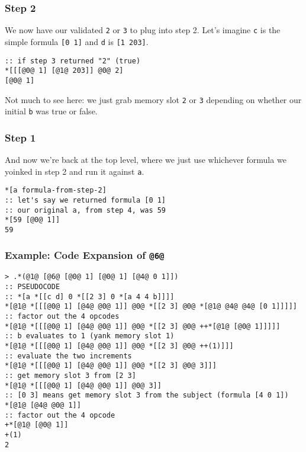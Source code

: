 \documentclass[twoside]{article}
\begin{document}
\subsubsection{Step 2}

We now have our validated \lstinline[style=inlinecode]{2} or \lstinline[style=inlinecode]{3} to plug into step 2. Let's imagine \lstinline[style=inlinecode]{c} is the simple formula \lstinline[style=inlinecode]{[0 1]} and \lstinline[style=inlinecode]{d} is \lstinline[style=inlinecode]{[1 203]}.

\begin{lstlisting}[style=listingblock]
:: if step 3 returned "2" (true)
*[[[@0@ 1] [@1@ 203]] @0@ 2]
[@0@ 1]
\end{lstlisting}

Not much to see here: we just grab memory slot \lstinline[style=inlinecode]{2} or \lstinline[style=inlinecode]{3} depending on whether our initial \lstinline[style=inlinecode]{b} was true or false.

\subsubsection{Step 1}

And now we're back at the top level, where we just use whichever formula we yoinked in step 2 and run it against \lstinline[style=inlinecode]{a}.

\begin{lstlisting}[style=listingblock]
*[a formula-from-step-2]
:: let's say we returned formula [0 1]
:: our original a, from step 4, was 59
*[59 [@0@ 1]]
59
\end{lstlisting}

\subsubsection{Example: Code Expansion of \lstinline[style=inlinecode]{@6@}}

\begin{lstlisting}[style=listingcode]
> .*(@1@ [@6@ [@0@ 1] [@0@ 1] [@4@ 0 1]])
:: PSEUDOCODE
:: *[a *[[c d] 0 *[[2 3] 0 *[a 4 4 b]]]]
*[@1@ *[[[@0@ 1] [@4@ @0@ 1]] @0@ *[[2 3] @0@ *[@1@ @4@ @4@ [0 1]]]]]
:: factor out the 4 opcodes
*[@1@ *[[[@0@ 1] [@4@ @0@ 1]] @0@ *[[2 3] @0@ ++*[@1@ [@0@ 1]]]]]
:: b evaluates to 1 (yank memory slot 1)
*[@1@ *[[[@0@ 1] [@4@ @0@ 1]] @0@ *[[2 3] @0@ ++(1)]]]
:: evaluate the two increments
*[@1@ *[[[@0@ 1] [@4@ @0@ 1]] @0@ *[[2 3] @0@ 3]]]
:: get memory slot 3 from [2 3]
*[@1@ *[[[@0@ 1] [@4@ @0@ 1]] @0@ 3]]
:: [0 3] means get memory slot 3 from the subject (formula [4 0 1])
*[@1@ [@4@ @0@ 1]]
:: factor out the 4 opcode
+*[@1@ [@0@ 1]]
+(1)
2
\end{lstlisting}
\end{document}
